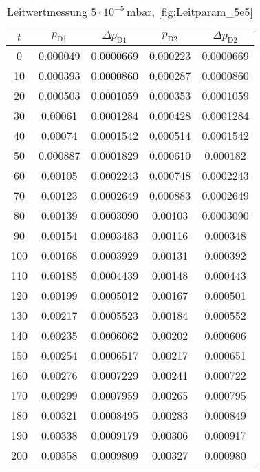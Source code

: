 \begin{table}[H]
    \centering
    \caption{Leitwertmessung $5 \cdot 10^{-5} \, \si{\milli\bar}$, \ref{fig:Leitparam_5e5}}
    \label{tab:Leitparam_5e5}
    \begin{tabular}{c c c c c}
        \toprule
        {$t$} & {$p_\text{D1}$} & {$\Delta p_\text{D1}$} & {$p_\text{D2}$} & {$\Delta p_\text{D2}$} \\
        \midrule
        0  &  0.000049 & 0.0000669 & 0.000223 & 0.0000669\\
        10 &  0.000393 & 0.0000860 & 0.000287 & 0.0000860\\
        20 &  0.000503 & 0.0001059 & 0.000353 & 0.0001059\\
        30 &  0.00061  & 0.0001284 & 0.000428 & 0.0001284\\
        40 &  0.00074  & 0.0001542 & 0.000514 & 0.0001542\\
        50 &  0.000887 & 0.0001829 & 0.000610 & 0.000182\\
        60 &  0.00105  & 0.0002243 & 0.000748 & 0.0002243\\
        70 &  0.00123  & 0.0002649 & 0.000883 & 0.0002649\\
        80 &  0.00139  & 0.0003090 & 0.00103 & 0.0003090\\
        90 &  0.00154  & 0.0003483 & 0.00116 & 0.000348\\
        100 & 0.00168  & 0.0003929 & 0.00131 & 0.000392\\
        110 & 0.00185  & 0.0004439 & 0.00148 & 0.000443\\
        120 & 0.00199  & 0.0005012 & 0.00167 & 0.000501\\
        130 & 0.00217  & 0.0005523 & 0.00184 & 0.000552\\
        140 & 0.00235  & 0.0006062 & 0.00202 & 0.000606\\
        150 & 0.00254  & 0.0006517 & 0.00217 & 0.000651\\
        160 & 0.00276  & 0.0007229 & 0.00241 & 0.000722\\
        170 & 0.00299  & 0.0007959 & 0.00265 & 0.000795\\
        180 & 0.00321  & 0.0008495 & 0.00283 & 0.000849\\
        190 & 0.00338  & 0.0009179 & 0.00306 & 0.000917\\
        200 & 0.00358  & 0.0009809 & 0.00327 & 0.000980\\
        \bottomrule
    \end{tabular}
\end{table}
